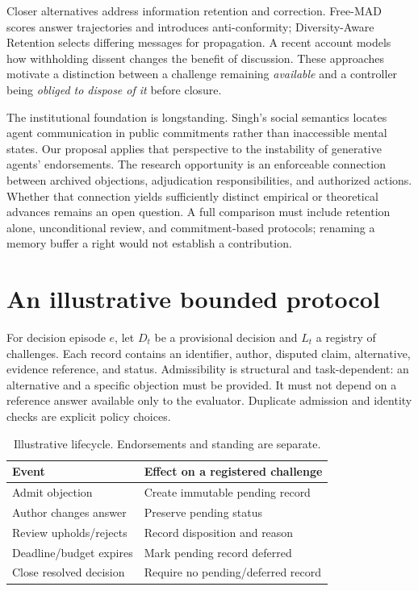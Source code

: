 \documentclass[sigconf,anonymous]{aamas}
\begin{document}
Closer alternatives address information retention and correction. Free-MAD scores answer trajectories and introduces anti-conformity\cite{cui2025}; Diversity-Aware Retention selects differing messages for propagation\cite{nguyen2026}. A recent account models how withholding dissent changes the benefit of discussion\cite{mansuri2026}. These approaches motivate a distinction between a challenge remaining \emph{available} and a controller being \emph{obliged to dispose of it} before closure.

The institutional foundation is longstanding. Singh's social semantics locates agent communication in public commitments rather than inaccessible mental states\cite{singh1999}. Our proposal applies that perspective to the instability of generative agents' endorsements. The research opportunity is an enforceable connection between archived objections, adjudication responsibilities, and authorized actions. Whether that connection yields sufficiently distinct empirical or theoretical advances remains an open question. A full comparison must include retention alone, unconditional review, and commitment-based protocols; renaming a memory buffer a right would not establish a contribution.

\section{An illustrative bounded protocol}
For decision episode $e$, let $D_t$ be a provisional decision and $L_t$ a registry of challenges. Each record contains an identifier, author, disputed claim, alternative, evidence reference, and status. Admissibility is structural and task-dependent: an alternative and a specific objection must be provided. It must not depend on a reference answer available only to the evaluator. Duplicate admission and identity checks are explicit policy choices.

\begin{table}[t]
\caption{Illustrative lifecycle. Endorsements and standing are separate.}
\label{tab:lifecycle}
\begin{tabular}{ll}
\toprule
Event & Effect on a registered challenge\\
\midrule
Admit objection & Create immutable pending record\\
Author changes answer & Preserve pending status\\
Review upholds/rejects & Record disposition and reason\\
Deadline/budget expires & Mark pending record deferred\\
Close resolved decision & Require no pending/deferred record\\
\bottomrule
\end{tabular}
\end{table}
\end{document}
